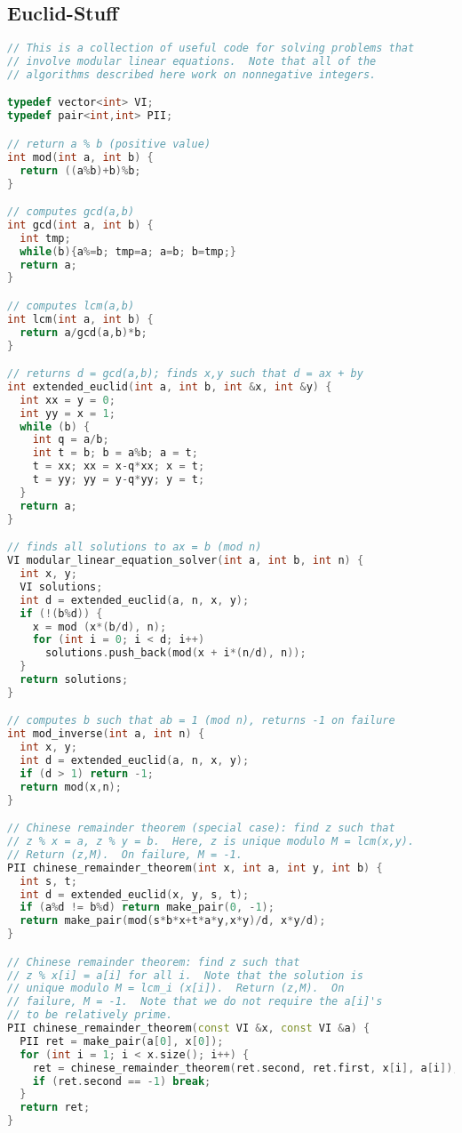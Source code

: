 \subsection{Euclid-Stuff}
\begin{lstlisting}[language=C++]
// This is a collection of useful code for solving problems that
// involve modular linear equations.  Note that all of the
// algorithms described here work on nonnegative integers.

typedef vector<int> VI;
typedef pair<int,int> PII;

// return a % b (positive value)
int mod(int a, int b) {
  return ((a%b)+b)%b;
}

// computes gcd(a,b)
int gcd(int a, int b) {
  int tmp;
  while(b){a%=b; tmp=a; a=b; b=tmp;}
  return a;
}

// computes lcm(a,b)
int lcm(int a, int b) {
  return a/gcd(a,b)*b;
}

// returns d = gcd(a,b); finds x,y such that d = ax + by
int extended_euclid(int a, int b, int &x, int &y) {  
  int xx = y = 0;
  int yy = x = 1;
  while (b) {
    int q = a/b;
    int t = b; b = a%b; a = t;
    t = xx; xx = x-q*xx; x = t;
    t = yy; yy = y-q*yy; y = t;
  }
  return a;
}

// finds all solutions to ax = b (mod n)
VI modular_linear_equation_solver(int a, int b, int n) {
  int x, y;
  VI solutions;
  int d = extended_euclid(a, n, x, y);
  if (!(b%d)) {
    x = mod (x*(b/d), n);
    for (int i = 0; i < d; i++)
      solutions.push_back(mod(x + i*(n/d), n));
  }
  return solutions;
}

// computes b such that ab = 1 (mod n), returns -1 on failure
int mod_inverse(int a, int n) {
  int x, y;
  int d = extended_euclid(a, n, x, y);
  if (d > 1) return -1;
  return mod(x,n);
}

// Chinese remainder theorem (special case): find z such that
// z % x = a, z % y = b.  Here, z is unique modulo M = lcm(x,y).
// Return (z,M).  On failure, M = -1.
PII chinese_remainder_theorem(int x, int a, int y, int b) {
  int s, t;
  int d = extended_euclid(x, y, s, t);
  if (a%d != b%d) return make_pair(0, -1);
  return make_pair(mod(s*b*x+t*a*y,x*y)/d, x*y/d);
}

// Chinese remainder theorem: find z such that
// z % x[i] = a[i] for all i.  Note that the solution is
// unique modulo M = lcm_i (x[i]).  Return (z,M).  On 
// failure, M = -1.  Note that we do not require the a[i]'s
// to be relatively prime.
PII chinese_remainder_theorem(const VI &x, const VI &a) {
  PII ret = make_pair(a[0], x[0]);
  for (int i = 1; i < x.size(); i++) {
    ret = chinese_remainder_theorem(ret.second, ret.first, x[i], a[i]);
    if (ret.second == -1) break;
  }
  return ret;
}


\end{lstlisting}
